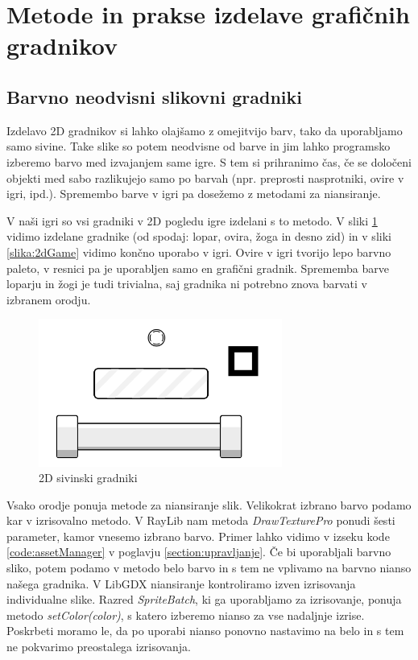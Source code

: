 \documentclass[12pt,a4paper,twoside]{book}
\begin{document}
\section{Metode in prakse izdelave grafičnih gradnikov}
\subsection{Barvno neodvisni slikovni gradniki}
Izdelavo 2D gradnikov si lahko olajšamo z omejitvijo barv, tako da uporabljamo samo sivine. Take slike so potem neodvisne od barve in jim lahko programsko izberemo barvo med izvajanjem same igre. S tem si prihranimo čas, če se določeni objekti med sabo razlikujejo samo po barvah (npr. preprosti nasprotniki, ovire v igri, ipd.). Spremembo barve v igri pa dosežemo z metodami za niansiranje.

V naši igri so vsi gradniki v 2D pogledu igre izdelani s to metodo. V sliki \ref{slika:grayscaleSprites} vidimo izdelane gradnike (od spodaj: lopar, ovira, žoga in desno zid) in v sliki \ref{slika:2dGame} vidimo končno uporabo v igri. Ovire v igri tvorijo lepo barvno paleto, v resnici pa je uporabljen samo en grafični gradnik. Sprememba barve loparju in žogi je tudi trivialna, saj gradnika ni potrebno znova barvati v izbranem orodju. 

\begin{figure}[h]
	\centering
	\includegraphics[width=8cm]{grayscaleSprites}
	\caption{2D sivinski gradniki}
	\label{slika:grayscaleSprites}
\end{figure}

Vsako orodje ponuja metode za niansiranje slik. Velikokrat izbrano barvo podamo kar v izrisovalno metodo. V RayLib nam metoda \textit{DrawTexturePro} ponudi šesti parameter, kamor vnesemo izbrano barvo. Primer lahko vidimo v izseku kode \ref{code:assetManager} v poglavju \ref{section:upravljanje}. Če bi uporabljali barvno sliko, potem podamo v metodo belo barvo in s tem ne vplivamo na barvno nianso našega gradnika. V LibGDX niansiranje kontroliramo izven izrisovanja individualne slike. Razred \textit{SpriteBatch}, ki ga uporabljamo za izrisovanje, ponuja metodo \textit{setColor(color)}, s katero izberemo nianso za vse nadaljnje izrise. Poskrbeti moramo le, da po uporabi nianso ponovno nastavimo na belo in s tem ne pokvarimo preostalega izrisovanja.
\end{document}

